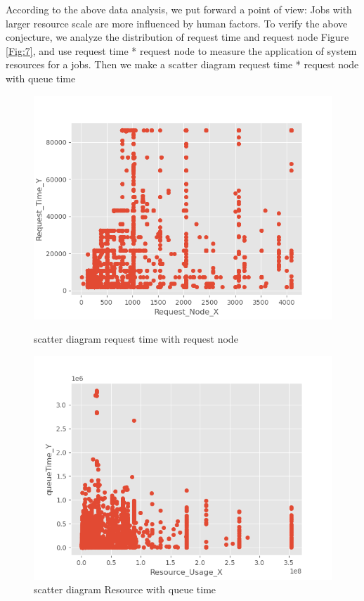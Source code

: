 \documentclass[conference,compsoc]{IEEEtran}
\begin{document}
According to the above data analysis, we put forward a point of view: Jobs with larger resource scale are more influenced by human factors. To verify the above conjecture, we analyze the distribution of request time and request node Figure \ref{Fig:7}, and use request time * request node to measure the application of system resources for a jobs.
Then we make a scatter diagram request time * request node with queue time
\begin{figure}[htbp]
	\begin{minipage}[t]{0.45\linewidth}
		\includegraphics[width=\linewidth]{nodetime.png} 
		\caption{scatter diagram request time with request node} 
		\label{Fig:7}
	\end{minipage}%
	\hfill%
	\begin{minipage}[t]{0.45\linewidth}
		\includegraphics[width=\linewidth]{Resource.png}
		\caption{scatter diagram Resource with queue time}
		\label{Fig:8}
	\end{minipage} 
\end{figure}
\end{document}
